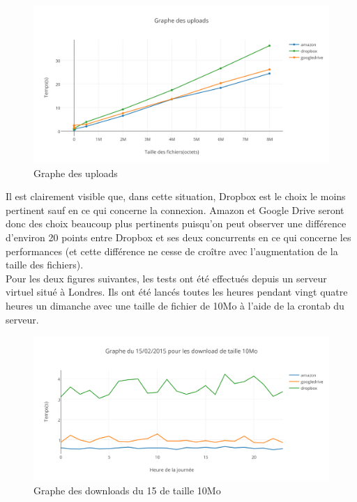 \documentclass[10pt]{article}
\begin{document}
\newpage

\begin{figure}[h]
\centering
\includegraphics[scale=0.7]{graphe_des_uploads.png}
\caption{Graphe des uploads}
\end{figure}


Il est clairement visible que, dans cette situation, Dropbox est le
choix le moins pertinent sauf en ce qui concerne la connexion. Amazon
et Google Drive seront donc des choix beaucoup plus pertinents
puisqu'on peut observer une différence d'environ 20 points entre
Dropbox et ses deux concurrents en ce qui concerne les performances
(et cette différence ne cesse de croître avec l'augmentation de la
taille des fichiers).\\

Pour les deux figures suivantes, les tests ont été effectués depuis un
serveur virtuel situé à Londres. Ils ont été lancés toutes les heures
pendant vingt quatre heures un dimanche avec une taille de fichier de
10Mo à l'aide de la crontab du serveur.


\begin{figure}[h]
\centering
\includegraphics[scale=0.7]{graphe_du_15022015_pour_les_download_de_taille_10mo.png}
\caption{Graphe des downloads du 15 de taille 10Mo}
\end{figure}
\end{document}
